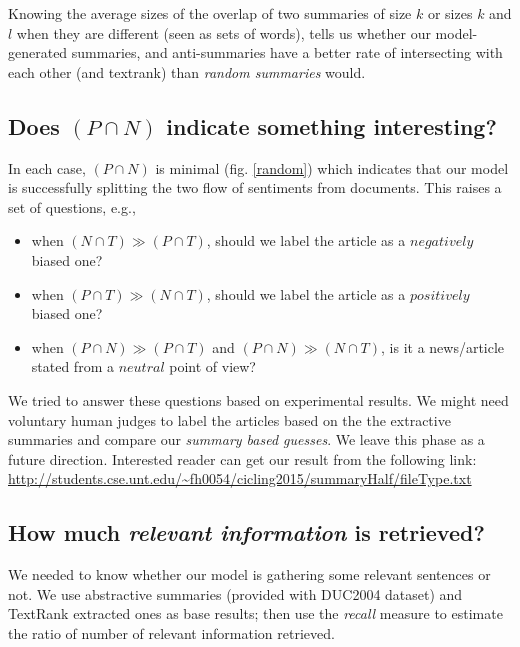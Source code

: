 \documentclass[a4paper]{report}
\begin{document}
Knowing the average sizes of the overlap of two summaries of size $k$ or sizes $k$ and $l$ when they are different (seen as sets of words), tells us whether our model-generated summaries, and anti-summaries have a better rate of intersecting with each other (and textrank) than {\em random summaries} would. 

\subsection{Does $(P \cap N)$ indicate something interesting?}
\par In each case, $(P \cap N)$ is minimal (fig. \ref{random}) which indicates that our model is successfully splitting the two flow of sentiments from documents. This raises a set of questions, e.g., 
\begin{small}
\begin{itemize}[noitemsep,nolistsep]
\item when $(N \cap T) \gg  (P \cap T)$, should we label the article as a $negatively$ biased one?%
\item when $(P \cap T) \gg (N \cap T)$,  should we label the article as a $positively$ biased one?%
\item when $(P\cap N) \gg (P \cap T)$ and $(P\cap N) \gg (N \cap T)$, is it a news/article stated from a $neutral$ point of view? 
\end{itemize}
\end{small}
We tried to answer these questions based on experimental results. We might need voluntary human judges
to label the articles based on the the extractive summaries and compare our \emph{summary based guesses}. We leave this phase as a future direction. Interested reader can get our result from the following link:
\url{http://students.cse.unt.edu/~fh0054/cicling2015/summaryHalf/fileType.txt}
\subsection{How much \emph{relevant information} is retrieved?}
We needed to know whether our model is gathering some relevant sentences or not. We use abstractive summaries (provided with DUC2004 dataset) and TextRank extracted ones as base results; then use the \emph{recall} measure to estimate the ratio of number of relevant information retrieved. 
\end{document}
